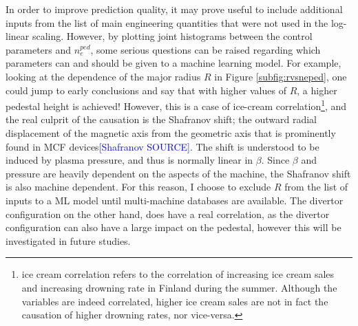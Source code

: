 \documentclass[a4paper, twoside, final, 12pt]{article}
\begin{document}
In order to improve prediction quality, it may prove useful to include additional inputs from the list of main engineering quantities that were not used in the log-linear scaling.
However, by plotting joint histograms between the control parameters and $n_e^{ped}$, some serious questions can be raised regarding which parameters can and should be given to a machine learning model.
For example, looking at the dependence of the major radius $R$ in Figure  \ref{subfig:rvsneped}, one could jump to early conclusions and say that with higher values of $R$, a higher pedestal height is achieved!
However, this is a case of ice-cream correlation\footnote{ice cream correlation refers to the correlation of increasing ice cream sales and increasing drowning rate in Finland during the summer. Although the variables are indeed correlated, higher ice cream sales are not in fact the causation of higher drowning rates, nor vice-versa.}, and the real culprit of the causation is the Shafranov shift; the outward radial displacement of the magnetic axis from the geometric axis that is prominently found in MCF devices\textcolor{blue}{[Shafranov SOURCE]}. The shift is understood to be induced by plasma pressure, and thus is normally linear in $\beta$. Since $\beta$ and pressure are heavily dependent on the aspects of the machine, the Shafranov shift is also machine dependent. 
For this reason, I choose to exclude $R$ from the list of inputs to a ML model until multi-machine databases are available.
The divertor configuration on the other hand, does have a real correlation, as the divertor configuration can also have a large impact on the pedestal, however this will be investigated in future studies.
\end{document}

